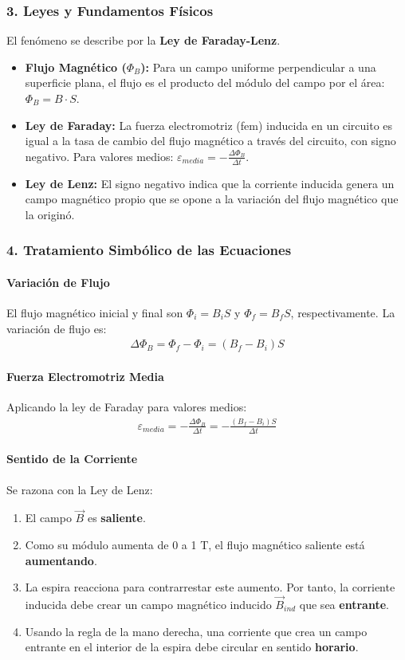 \subsubsection*{3. Leyes y Fundamentos Físicos}
El fenómeno se describe por la \textbf{Ley de Faraday-Lenz}.
\begin{itemize}
    \item \textbf{Flujo Magnético ($\Phi_B$):} Para un campo uniforme perpendicular a una superficie plana, el flujo es el producto del módulo del campo por el área: $\Phi_B = B \cdot S$.
    \item \textbf{Ley de Faraday:} La fuerza electromotriz (fem) inducida en un circuito es igual a la tasa de cambio del flujo magnético a través del circuito, con signo negativo. Para valores medios: $\varepsilon_{media} = -\frac{\Delta\Phi_B}{\Delta t}$.
    \item \textbf{Ley de Lenz:} El signo negativo indica que la corriente inducida genera un campo magnético propio que se opone a la variación del flujo magnético que la originó.
\end{itemize}

\subsubsection*{4. Tratamiento Simbólico de las Ecuaciones}
\paragraph*{Variación de Flujo}
El flujo magnético inicial y final son $\Phi_i = B_i S$ y $\Phi_f = B_f S$, respectivamente. La variación de flujo es:
\begin{gather}
    \Delta\Phi_B = \Phi_f - \Phi_i = (B_f - B_i) S
\end{gather}
\paragraph*{Fuerza Electromotriz Media}
Aplicando la ley de Faraday para valores medios:
\begin{gather}
    \varepsilon_{media} = -\frac{\Delta\Phi_B}{\Delta t} = -\frac{(B_f - B_i) S}{\Delta t}
\end{gather}
\paragraph*{Sentido de la Corriente}
Se razona con la Ley de Lenz:
\begin{enumerate}
    \item El campo $\vec{B}$ es \textbf{saliente}.
    \item Como su módulo aumenta de 0 a 1 T, el flujo magnético saliente está \textbf{aumentando}.
    \item La espira reacciona para contrarrestar este aumento. Por tanto, la corriente inducida debe crear un campo magnético inducido $\vec{B}_{ind}$ que sea \textbf{entrante}.
    \item Usando la regla de la mano derecha, una corriente que crea un campo entrante en el interior de la espira debe circular en sentido \textbf{horario}.
\end{enumerate}


